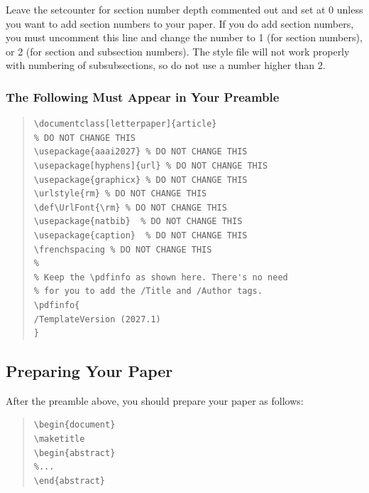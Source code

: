 \documentclass[letterpaper]{article} %
\def\UrlFont{\rm}  %
\begin{document}
Leave the setcounter for section number depth commented out and set at 0 unless you want to add section numbers to your paper. If you do add section numbers, you must uncomment this line and change the number to 1 (for section numbers), or 2 (for section and subsection numbers). The style file will not work properly with numbering of subsubsections, so do not use a number higher than 2.

\subsubsection{The Following Must Appear in Your Preamble}
\begin{quote}
\begin{scriptsize}\begin{verbatim}
\documentclass[letterpaper]{article}
% DO NOT CHANGE THIS
\usepackage{aaai2027} % DO NOT CHANGE THIS
\usepackage[hyphens]{url} % DO NOT CHANGE THIS
\usepackage{graphicx} % DO NOT CHANGE THIS
\urlstyle{rm} % DO NOT CHANGE THIS
\def\UrlFont{\rm} % DO NOT CHANGE THIS
\usepackage{natbib}  % DO NOT CHANGE THIS
\usepackage{caption}  % DO NOT CHANGE THIS
\frenchspacing % DO NOT CHANGE THIS
%
% Keep the \pdfinfo as shown here. There's no need
% for you to add the /Title and /Author tags.
\pdfinfo{
/TemplateVersion (2027.1)
}
\end{verbatim}\end{scriptsize}
\end{quote}

\subsection{Preparing Your Paper}

After the preamble above, you should prepare your paper as follows:
\begin{quote}
\begin{scriptsize}\begin{verbatim}
\begin{document}
\maketitle
\begin{abstract}
%...
\end{abstract}\end{verbatim}\end{scriptsize}
\end{quote}
\end{document}
